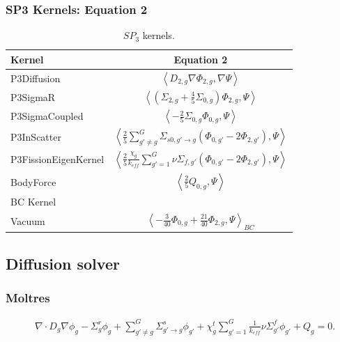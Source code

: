 \begin{frame}
\frametitle{SP3 Kernels: Equation 2}

\begin{table}[htbp!]
  \centering
  \caption{$SP_3$ kernels.}
  \begin{tabular}{lc}
  \toprule
  Kernel                & Equation 2 \\
  \midrule
  P3Diffusion           & $\left< D_{2,g} \nabla \Phi_{2,g}, \nabla \Psi \right>$ \\
  P3SigmaR              & $\left< \left( \Sigma_{2,g} + \frac{4}{5} \Sigma_{0,g} \right) \Phi_{2,g}, \Psi \right>$ \\
  P3SigmaCoupled        & $\left< - \frac{2}{5} \Sigma_{0,g} \Phi_{0,g}, \Psi \right>$ \\
  P3InScatter           & $\left< \frac{2}{5} \sum_{g'\ne g}^G \Sigma_{s0,g' \rightarrow g} \left( \Phi_{0,g'} - 2 \Phi_{2,g'} \right), \Psi \right>$ \\
  P3FissionEigenKernel  & $\left< \frac{2}{5} \frac{\chi_g}{k_{eff}} \sum_{g'=1}^G \nu\Sigma_{f,g'} \left( \Phi_{0,g'} - 2 \Phi_{2,g'} \right), \Psi \right>$ \\
  BodyForce             & $\left< \frac{2}{5} Q_{0,g}, \Psi \right>$ \\
  \midrule
  BC Kernel & \\
  \midrule
  Vacuum                & $\left< - \frac{3}{40} \Phi_{0,g} + \frac{21}{40} \Phi_{2,g}, \Psi \right>_{BC}$ \\
  \bottomrule
  \end{tabular}
  \label{tab:kernels}
\end{table}
\end{frame}


\subsection{Diffusion solver}
\begin{frame}
\frametitle{Moltres}

\begin{align}
  & \nabla \cdot D_g \nabla \phi_g - \Sigma_g^r \phi_g + \sum_{g' \ne g}^G \Sigma_{g'\rightarrow g}^s \phi_{g'} +
  \chi_g^t \sum_{g' = 1}^G \frac{1}{k_{eff}}\nu \Sigma_{g'}^f \phi_{g'} + Q_g = 0. \label{eq:diffusion-eig}
\end{align}
\end{frame}


